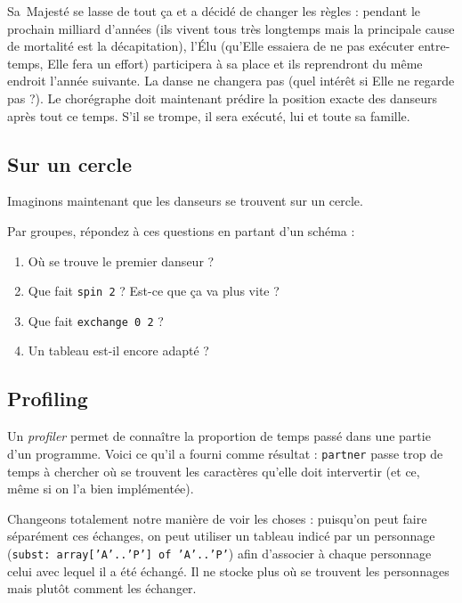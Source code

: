 \documentclass[11pt,a4paper,oneside]{article}
\begin{document}
Sa~Majesté se lasse de tout ça et a décidé de changer les règles :
pendant le prochain milliard d'années (ils vivent tous très longtemps mais la
principale cause de mortalité est la décapitation), l'Élu
(qu'Elle essaiera de ne pas exécuter entre-temps, Elle fera un effort)
participera à sa place et ils reprendront du même endroit l'année suivante.
La danse ne changera pas (quel intérêt si Elle ne regarde pas ?).
Le chorégraphe doit maintenant prédire la position exacte des danseurs après
tout ce temps. S'il se trompe, il sera exécuté, lui et toute sa famille.


\subsection{Sur un cercle}
Imaginons maintenant que les danseurs se trouvent sur un cercle.

Par groupes, répondez à ces questions en partant d'un schéma :
\begin{enumerate}
\item Où se trouve le premier danseur ?
\item Que fait \texttt{spin 2} ? Est-ce que ça va plus vite ?
\item Que fait \texttt{exchange 0 2} ?
\item Un tableau est-il encore adapté ?
\end{enumerate}

\subsection{Profiling}
Un \emph{profiler} permet de connaître la proportion de temps passé dans
une partie d'un programme. Voici ce qu'il a fourni comme résultat :
\texttt{partner} passe trop de temps à chercher où se trouvent les caractères
qu'elle doit intervertir (et ce, même si on l'a bien implémentée).

Changeons totalement notre manière de voir les choses : puisqu'on peut faire
séparément ces échanges, on peut utiliser un tableau indicé
par un personnage (\texttt{subst: array['A'..'P'] of 'A'..'P'}) afin d'associer
à chaque personnage celui avec lequel il a été échangé.
Il ne stocke plus où se trouvent les personnages mais plutôt comment les échanger.
\end{document}
